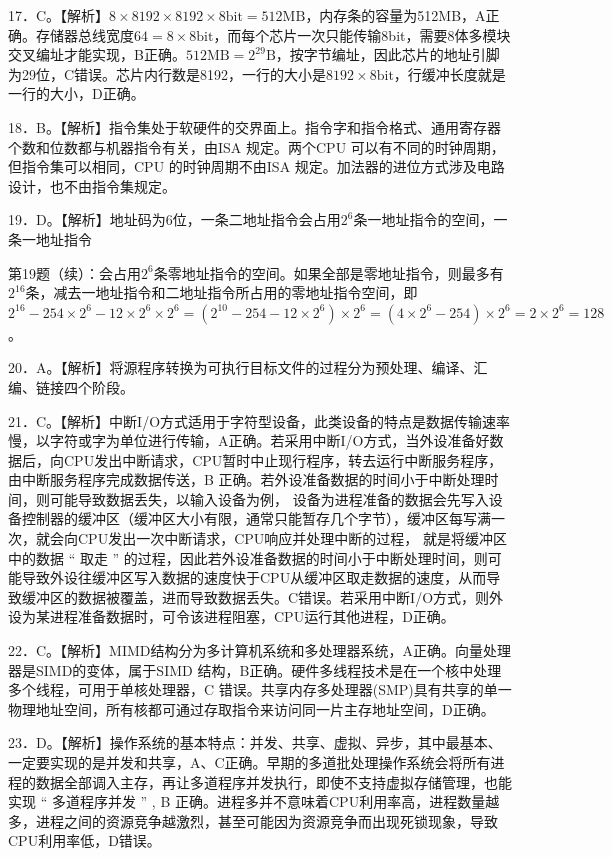 \documentclass[UTF8,11pt]{ctexart}
\begin{document}
17．C。【解析】\(\displaystyle 8\times8192\times8192\times8\mathrm{bit}=512\mathrm{MB}\)，内存条的容量为512MB，A正确。存储器总线宽度\(\displaystyle 64=8\times8\mathrm{bit}\)，而每个芯片一次只能传输8bit，需要8体多模块交叉编址才能实现，B正确。\(\displaystyle 512\mathrm{MB}=2^{29}\mathrm{B}\)，按字节编址，因此芯片的地址引脚为29位，C错误。芯片内行数是8192，一行的大小是\(\displaystyle 8192\times8\mathrm{bit}\)，行缓冲长度就是一行的大小，D正确。


18．B。【解析】指令集处于软硬件的交界面上。指令字和指令格式、通用寄存器个数和位数都与机器指令有关，由ISA 规定。两个CPU 可以有不同的时钟周期，但指令集可以相同，CPU 的时钟周期不由ISA 规定。加法器的进位方式涉及电路设计，也不由指令集规定。


19．D。【解析】地址码为6位，一条二地址指令会占用\(\displaystyle 2^6\)条一地址指令的空间，一条一地址指令


第19题（续）：会占用\(\displaystyle 2^6\)条零地址指令的空间。如果全部是零地址指令，则最多有\(\displaystyle 2^{16}\)条，减去一地址指令和二地址指令所占用的零地址指令空间，即\(\displaystyle 2^{16}-254\times2^6-12\times2^6\times2^6=(2^{10}-254-12\times2^6)\times2^6=(4\times2^6-254)\times2^6=2\times2^6=128\)。


20．A。【解析】将源程序转换为可执行目标文件的过程分为预处理、编译、汇编、链接四个阶段。


21．C。【解析】中断I/O方式适用于字符型设备，此类设备的特点是数据传输速率慢，以字符或字为单位进行传输，A正确。若采用中断I/O方式，当外设准备好数据后，向CPU发出中断请求，CPU暂时中止现行程序，转去运行中断服务程序，由中断服务程序完成数据传送，B 正确。若外设准备数据的时间小于中断处理时间，则可能导致数据丢失，以输入设备为例， 设备为进程准备的数据会先写入设备控制器的缓冲区（缓冲区大小有限，通常只能暂存几个字节），缓冲区每写满一次，就会向CPU发出一次中断请求，CPU响应并处理中断的过程， 就是将缓冲区中的数据 “ 取走 ” 的过程，因此若外设准备数据的时间小于中断处理时间，则可能导致外设往缓冲区写入数据的速度快于CPU从缓冲区取走数据的速度，从而导致缓冲区的数据被覆盖，进而导致数据丢失。C错误。若采用中断I/O方式，则外设为某进程准备数据时，可令该进程阻塞，CPU运行其他进程，D正确。


22．C。【解析】MIMD结构分为多计算机系统和多处理器系统，A正确。向量处理器是SIMD的变体，属于SIMD 结构，B正确。硬件多线程技术是在一个核中处理多个线程，可用于单核处理器，C 错误。共享内存多处理器(SMP)具有共享的单一物理地址空间，所有核都可通过存取指令来访问同一片主存地址空间，D正确。


23．D。【解析】操作系统的基本特点：并发、共享、虚拟、异步，其中最基本、一定要实现的是并发和共享，A、C正确。早期的多道批处理操作系统会将所有进程的数据全部调入主存，再让多道程序并发执行，即使不支持虚拟存储管理，也能实现 “ 多道程序并发 ” , B 正确。进程多并不意味着CPU利用率高，进程数量越多，进程之间的资源竞争越激烈，甚至可能因为资源竞争而出现死锁现象，导致CPU利用率低，D错误。
\end{document}
